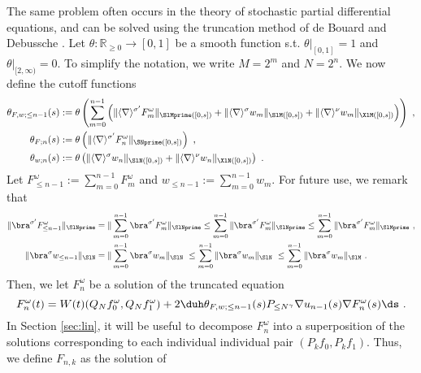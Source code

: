 \documentclass[11pt]{article}
\begin{document}
 The same problem often occurs in the theory of stochastic partial differential equations, and can be solved using the truncation method of de Bouard and Debussche \cite{BD99}.
 Let \( \theta \colon \mathbb{R}_{\geq 0} \rightarrow [0,1] \) be a smooth function s.t. \( \theta|_{[0,1]} = 1 \) and \( \theta|_{[2,\infty)} = 0 \). To simplify the notation, we write \( M=2^m \) and \( N=2^n \). We now define the cutoff functions
 \begin{align}
 \theta_{F,w;\leq n-1}(s)
 &:= \theta\left(\sum_{m=0}^{n-1} \Big(\| \langle \nabla \rangle^{\sigma^\prime} F_{m}^\omega \|_{\SlMprime([0,s])} +\| \langle \nabla \rangle^{\sigma} w_m \|_{\SlM([0,s])}+ \| \langle \nabla \rangle^{\nu} w_m \|_{ \XlM([0,s])}\Big) \right)~, \notag \\
\theta_{F;n}(s) &:= \theta\left( \| \langle \nabla \rangle^{\sigma^\prime} F_{n}^\omega \|_{\SNprime([0,s])}\right)~, \notag\\
\theta_{w;n}(s) &:= \theta\left( \| \langle \nabla \rangle^{\sigma} w_n \|_{\SlN([0,s])}+ \| \langle \nabla \rangle^{\nu} w_n \|_{ \XlN([0,s])}\right)~. \label{it:eq_theta_wn}
\end{align}
Let \( F_{\leq n-1}^\omega := \sum_{m=0}^{n-1} F_m^\omega \) and \( w_{\leq n-1} := \sum_{m=0}^{n-1} w_m \). 
For future use, we remark that 
\begin{equation}\label{it:eq_triangle}
\begin{aligned}
\| \bra^{\sigma^\prime} F_{\leq n-1}^\omega \|_{\SlNprime}&= \| \sum_{m=0}^{n-1} \bra^{\sigma^\prime} F_m^{\omega} \|_{\SlNprime} \leq \sum_{m=0}^{n-1} \| \bra^{\sigma^\prime} F_m^\omega \|_{\SlNprime} \leq \sum_{m=0}^{n-1} \| \bra^{\sigma^\prime} F_m^\omega \|_{\SlMprime} ~,\\
\| \bra^\sigma w_{\leq n-1} \|_{\SlN} &= \| \sum_{m=0}^{n-1} \bra^{\sigma} w_m \|_{\SlN} ~ \leq \sum_{m=0}^{n-1} \| \bra^{\sigma} w_m \|_{\SlN} ~  \leq \sum_{m=0}^{n-1} \| \bra^{\sigma} w_m \|_{\SlM}~.
\end{aligned}
\end{equation}
Then, we let \( F_n^\omega \) be a solution of the truncated equation
\begin{equation}
F_n^\omega(t)= W(t) (Q_N f_0^\omega, Q_N f_1^\omega) + 2 \duh \theta_{F,w;\leq n-1}(s) P_{\leq N^\gamma} \nabla u_{n-1}(s) \nabla F_n^\omega(s) \ds~. \label{it:eq_truncated_Fn}
\end{equation}
In Section \ref{sec:lin}, it will be useful to decompose \( F_n^\omega \) into a superposition of the solutions corresponding to each individual individual pair \( (P_k f_0, P_k f_1) \). Thus, we define \( F_{n,k} \) as the solution of 
\end{document}
